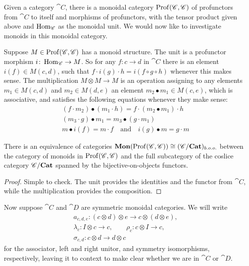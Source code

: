 \documentclass[12pt,oneside,article,draft]{memoir}
\begin{document}
Given a category $\cat{C}$, there is a monoidal category $\operatorname{Prof}(\mathscr{C},\mathscr{C})$ of profunctors from $\cat{C}$ to itself and morphisms of profunctors, with the tensor product given above and $\operatorname{Hom}_{\mathscr{C}}$ as the monoidal unit. We would now like to investigate monoids in this monoidal category.

Suppose $M\in\operatorname{Prof}(\mathscr{C},\mathscr{C})$ has a monoid structure. The unit is a profunctor morphism $i\colon\operatorname{Hom}_{\mathscr{C}}\to M$. So for any $f\colon c\to d$ in $\cat{C}$ there is an element $i(f)\in M(c,d)$, such that $f\cdot i(g)\cdot h = i(f\circ g\circ h)$ whenever this makes sense. The multiplication $M\otimes M\to M$ is an operation assigning to any elements $m_1\in M(c,d)$ and $m_2\in M(d,e)$ an element $m_2\bullet m_1\in M(c,e)$, which is associative, and satisfies the following equations whenever they make sense:
\begin{gather*}
	(f\cdot m_2)\bullet(m_1\cdot h) = f\cdot(m_2\bullet m_1)\cdot h \\
	(m_3\cdot g)\bullet m_1 = m_3\bullet(g\cdot m_1) \\
	m\bullet i(f) = m\cdot f \quad\text{and}\quad i(g)\bullet m = g\cdot m
\end{gather*}

\begin{lemma}
	There is an equivalence of categories $\mathbf{Mon}(\operatorname{Prof}(\mathscr{C},\mathscr{C}))\cong (\mathscr{C}/\mathbf{Cat})_{b.o.o.}$ between the category of monoids in $\operatorname{Prof}(\mathscr{C},\mathscr{C})$ and the full subcategory of the coslice category $\mathscr{C}/\mathbf{Cat}$ spanned by the bijective-on-objects functors.
\end{lemma}
\begin{proof}
	Simple to check. The unit provides the identities and the functor from $\cat{C}$, while the multiplication provides the composition.
\end{proof}

Now suppose $\cat{C}$ and $\cat{D}$ are symmetric monoidal categories. We will write
\begin{gather*}
	a_{c,d,e}\colon (c\otimes d)\otimes e \to c\otimes(d\otimes e), \\
		\lambda_c\colon I\otimes c\to c,
		\qquad \rho_c\colon c\otimes I \to c, \\
		\sigma_{c,d}\colon c\otimes d\to d\otimes c
\end{gather*}
for the associator, left and right unitor, and symmetry isomorphisms, respectively, leaving it to context to make clear whether we are in $\cat{C}$ or $\cat{D}$.
\end{document}

